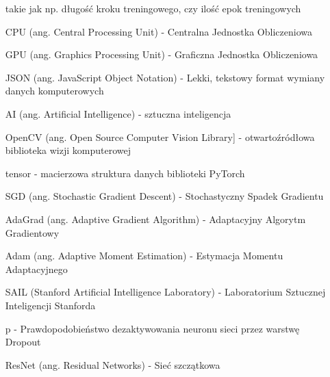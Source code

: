 \begin{itemize}
    takie jak np. długość kroku treningowego, czy ilość epok treningowych
    \item[CPU] (ang. Central Processing Unit) - Centralna Jednostka Obliczeniowa
    \item[GPU] (ang. Graphics Processing Unit) - Graficzna Jednostka Obliczeniowa
    \item[JSON] (ang. JavaScript Object Notation) - Lekki, tekstowy format wymiany danych komputerowych
    \item[AI] (ang. Artificial Intelligence) - sztuczna inteligencja
    \item[OpenCV] (ang. Open Source Computer Vision Library] - otwartoźródłowa biblioteka wizji komputerowej
    \item[tensor] - macierzowa struktura danych biblioteki PyTorch
    \item[SGD] (ang. Stochastic Gradient Descent) - Stochastyczny Spadek Gradientu
    \item[AdaGrad] (ang. Adaptive Gradient Algorithm) - Adaptacyjny Algorytm Gradientowy
    \item[Adam] (ang. Adaptive Moment Estimation) - Estymacja Momentu Adaptacyjnego
    \item[SAIL] (Stanford Artificial Intelligence Laboratory) - Laboratorium Sztucznej Inteligencji Stanforda
    \item[p] - Prawdopodobieństwo dezaktywowania neuronu sieci przez warstwę Dropout
    \item[ResNet] (ang. Residual Networks) - Sieć szczątkowa


  \end{itemize}
